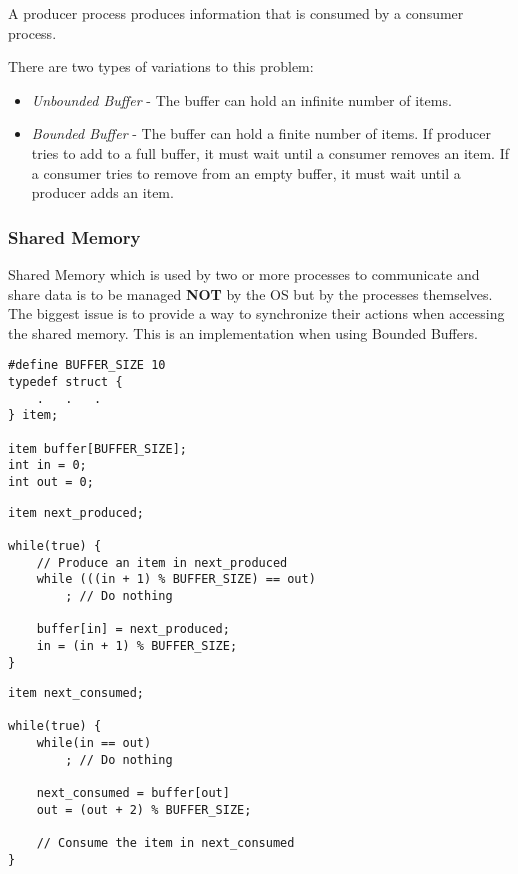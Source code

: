 \documentclass[]{article}
\begin{document}
A producer process produces information that is consumed by a consumer process. 

There are two types of variations to this problem:
\begin{itemize}
    \item \emph{Unbounded Buffer} - The buffer can hold an infinite number of items.
    \item \emph{Bounded Buffer} - The buffer can hold a finite number of items. If producer tries to add to a full buffer, it must wait until a consumer removes an item. If a consumer tries to remove from an empty buffer, it must wait until a producer adds an item.
\end{itemize}

\subsubsection*{Shared Memory}

Shared Memory which is used by two or more processes to communicate and share data is to be managed \textbf{NOT} by the OS but by the processes themselves. The biggest issue is to provide a way to synchronize their actions when accessing the shared memory. This is an implementation when using Bounded Buffers.

\begin{tcolorbox}[title = Shared Data]
\begin{verbatim}
#define BUFFER_SIZE 10
typedef struct {
    .   .   .
} item;

item buffer[BUFFER_SIZE];
int in = 0;
int out = 0;
\end{verbatim}
\end{tcolorbox}

\begin{tcolorbox}[title = Producer]
\begin{verbatim}
item next_produced;

while(true) {
    // Produce an item in next_produced
    while (((in + 1) % BUFFER_SIZE) == out)
        ; // Do nothing

    buffer[in] = next_produced;
    in = (in + 1) % BUFFER_SIZE;
}

\end{verbatim}
\end{tcolorbox}

\begin{tcolorbox}[title = Consumer]
\begin{verbatim}
item next_consumed;

while(true) {
    while(in == out)
        ; // Do nothing

    next_consumed = buffer[out]
    out = (out + 2) % BUFFER_SIZE;

    // Consume the item in next_consumed
}
\end{verbatim}
\end{tcolorbox}
\end{document}

